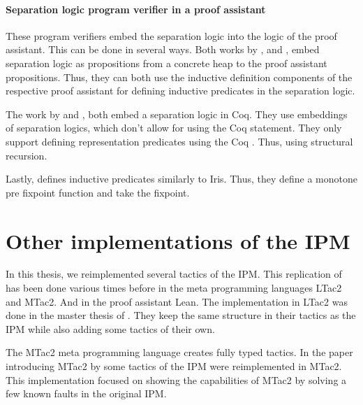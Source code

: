 \documentclass[thesis.tex]{subfiles}
\begin{document}
\paragraph{Separation logic program verifier in a proof assistant}
These program verifiers embed the separation logic into the logic of the proof assistant. This can be done in several ways. Both works by  \cite{appelTacticsSeparationLogic}, and  \cite{rouvoetIntrinsicallyTypedCompilation2021}, embed separation logic as propositions from a concrete heap to the proof assistant propositions. Thus, they can both use the inductive definition components of the respective proof assistant for defining inductive predicates in the separation logic.

The work by  \cite{chlipalaMostlyautomatedVerificationLowlevel2011} and  \cite{bengtsonCharge2012}, both embed a separation logic in Coq. They use embeddings of separation logics, which don't allow for using the Coq  statement. They only support defining representation predicates using the Coq . Thus, using structural recursion.

Lastly,  \cite{appelProgramLogicsCertified2014} defines inductive predicates similarly to Iris. Thus, they define a monotone pre fixpoint function and take the fixpoint.

\section{Other implementations of the IPM}
In this thesis, we reimplemented several tactics of the IPM. This replication of \cite{krebbersInteractiveProofsHigherorder2017} has been done various times before in the meta programming languages LTac2 and MTac2. And in the proof assistant Lean. The implementation in LTac2 was done in the master thesis of  \cite{liesnikovExtendingAutomatingIris2020}. They keep the same structure in their tactics as the IPM while also adding some tactics of their own.

The MTac2 meta programming language creates fully typed tactics. In the paper introducing MTac2 by  \cite{kaiserMtac2TypedTactics2018} some tactics of the IPM were reimplemented in MTac2. This implementation focused on showing the capabilities of MTac2 by solving a few known faults in the original IPM.
\end{document}
